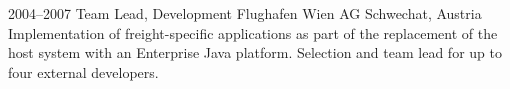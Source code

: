 \cventry
{2004--2007}
{Team Lead, Development}
{}
{Flughafen Wien AG}
{Schwechat, Austria}
{
  Implementation of freight-specific applications as part of the replacement of the
  host system with an Enterprise Java platform. Selection and team lead for
  up to four external developers.
}
